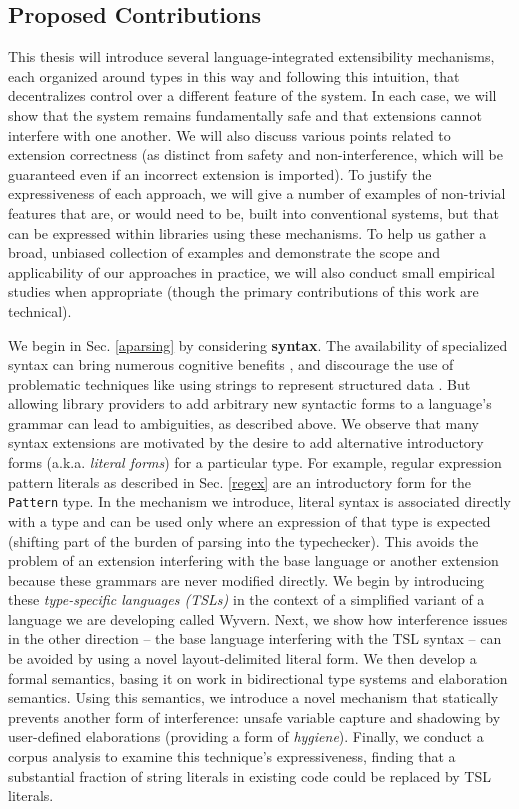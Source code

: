 \subsection{Proposed Contributions}
This thesis will introduce several language-integrated extensibility mechanisms, each organized around types in this way and following this intuition, that decentralizes control over a different feature of the system. In each case, we will show that the system remains fundamentally safe and that extensions cannot interfere with one another. We will also discuss various points related to extension correctness (as distinct from safety and non-interference, which will be guaranteed even if an incorrect extension is imported). To justify the  expressiveness of each approach, we will give a number of examples of non-trivial features that are, or would need to be, built into conventional systems, but that can be expressed within libraries using these mechanisms. To help us gather a broad, unbiased collection of examples and demonstrate the scope and applicability of our approaches in practice, we will also conduct small empirical studies when appropriate (though the primary contributions of this work are technical).

We begin in Sec. \ref{aparsing} by considering \textbf{syntax}. The availability of specialized syntax can bring numerous cognitive benefits \cite{green1996usability}, and discourage the use of problematic techniques like using strings to represent structured data \cite{Bravenboer:2007:PIA:1289971.1289975}. But allowing library providers to add arbitrary new syntactic forms to a language's grammar can lead to ambiguities, as described above. We observe that many syntax extensions are motivated by the desire to add alternative  introductory forms (a.k.a. \emph{literal forms}) for a particular type. For example, regular expression pattern literals as described in Sec. \ref{regex} are an introductory form for the \verb|Pattern| type.  In the mechanism we introduce, literal syntax is associated directly with a type and can be used only where an expression of that type is expected (shifting part of the burden of parsing into the typechecker). This avoids the problem of an extension interfering with the base language or another extension  because these grammars are never modified directly. We begin by introducing these \emph{type-specific languages (TSLs)} in the context of a simplified variant of a language we are developing called Wyvern. Next, we show how interference issues in the other direction -- the base language interfering with  the TSL syntax -- can be avoided by using a novel layout-delimited literal form. We then develop a formal semantics, basing it on work in bidirectional type systems and elaboration semantics. Using this semantics, we introduce a novel mechanism that statically prevents another form of interference: unsafe variable capture and shadowing by user-defined elaborations (providing a form of \emph{hygiene}). Finally, we conduct a corpus analysis to examine this technique's expressiveness, finding that a substantial fraction of string literals in existing code could be replaced by TSL literals.

